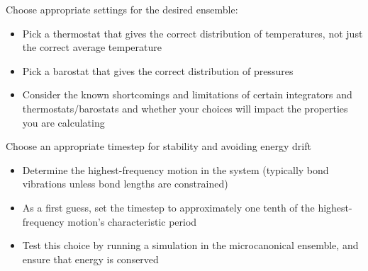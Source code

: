 \documentclass[9pt,bestpractices]{livecoms}
\begin{document}
\begin{Checklists*}[p!]
\begin{checklist}{Choose appropriate settings for the desired ensemble:}
\begin{itemize}
\item Pick a thermostat that gives the correct distribution of temperatures, not just the correct average temperature
\item Pick a barostat that gives the correct distribution of pressures
\item Consider the known shortcomings and limitations of certain integrators and thermostats/barostats and whether your choices will impact the properties you are calculating
\end{itemize}
\end{checklist}


\begin{checklist}{Choose an appropriate timestep for stability and avoiding energy drift}
\begin{itemize}
\item Determine the highest-frequency motion in the system (typically bond vibrations unless bond lengths are constrained)
\item As a first guess, set the timestep to approximately one tenth of the highest-frequency motion's characteristic period
\item Test this choice by running a simulation in the microcanonical ensemble, and ensure that energy is conserved
\end{itemize}
\end{checklist}


\end{Checklists*}







\nocite{*}
{}
\end{document}
